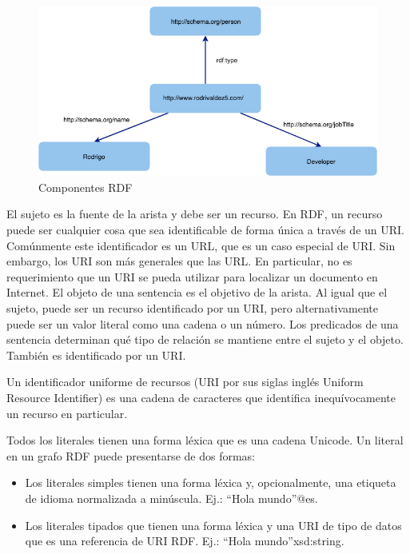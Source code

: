     \begin{figure}[ht!]
    \centering
    \includegraphics[width=150mm]{figuras/Diagramas-RDFGraph}
    \caption{Componentes RDF}
    \label{img:componentes rdf }
    \end{figure}
    
El sujeto es la fuente de la arista y debe ser un recurso. En RDF, un recurso puede ser cualquier cosa que sea identificable de forma única a través de un URI. Comúnmente este identificador es un URL, que es un caso especial de URI. Sin embargo, los URI son más generales que las URL. En particular, no es requerimiento que un URI se pueda utilizar para localizar un documento en Internet. El objeto de una sentencia es el objetivo de la arista. Al igual que el sujeto, puede ser un recurso identificado por un URI, pero alternativamente puede ser un valor literal como una cadena o un número. Los predicados de una sentencia determinan qué tipo de relación se mantiene entre el sujeto y el objeto. También es identificado por un URI.

Un identificador uniforme de recursos (URI por sus siglas inglés Uniform Resource Identifier) es una cadena de caracteres que identifica inequívocamente un recurso en particular. 

Todos los literales tienen una forma léxica que es una cadena Unicode. Un literal en un grafo RDF puede presentarse de dos formas:
\begin{itemize}
    \item Los literales simples tienen una forma léxica y, opcionalmente, una etiqueta de idioma normalizada a minúscula. Ej.: “Hola mundo”@es.
    \item Los literales tipados que tienen una forma léxica y una URI de tipo de datos que es una referencia de URI RDF. Ej.: “Hola mundo”xsd:string.
\end{itemize}

